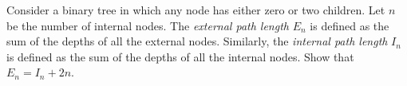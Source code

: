 Consider a binary tree in which any node has either zero or two children.
Let $n$ be the number of internal nodes. The {\em external path length}
$E_n$ is defined as the sum of the depths of all the external nodes.
Similarly, the {\em internal path length} $I_n$ is defined as the sum of the 
depths of all the internal nodes. Show that $E_n = I_n + 2n$.
